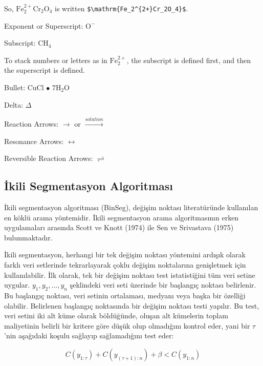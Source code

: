 \documentclass[12pt,twoside]{deuthesis}
\begin{document}
So, \(\mathrm{Fe_2^{2+}Cr_2O_4}\) is written \texttt{\$\textbackslash{}mathrm\{Fe\_2\^{}\{2+\}Cr\_2O\_4\}\$}.

\noindent Exponent or Superscript: \(\mathrm{O^-}\)

\noindent Subscript: \(\mathrm{CH_4}\)

To stack numbers or letters as in \(\mathrm{Fe_2^{2+}}\), the subscript is defined first, and then the superscript is defined.

\noindent Bullet: CuCl \(\bullet\) \(\mathrm{7H_{2}O}\)

\noindent Delta: \(\Delta\)

\noindent Reaction Arrows: \(\longrightarrow\) or \(\xrightarrow{solution}\)

\noindent Resonance Arrows: \(\leftrightarrow\)

\noindent Reversible Reaction Arrows: \(\rightleftharpoons\)

\hypertarget{ikili-segmentasyon-algoritmasux131}{%
\subsection{İkili Segmentasyon Algoritması}\label{ikili-segmentasyon-algoritmasux131}}

İkili segmentasyon algoritması (BinSeg), değişim noktası literatüründe kullanılan en köklü arama yöntemidir. İkili segmentasyon arama algoritmasının erken uygulamaları arasında Scott ve Knott (1974) ile Sen ve Srivastava (1975) bulunmaktadır.

İkili segmentasyon, herhangi bir tek değişim noktası yöntemini ardışık olarak farklı veri setlerinde tekrarlayarak çoklu değişim noktalarına genişletmek için kullanılabilir. İlk olarak, tek bir değişim noktası test istatistiğini tüm veri setine uygular. \(y_{1},y_{2},...,y_{n}\) şeklindeki veri seti üzerinde bir başlangıç noktası belirlenir. Bu başlangıç noktası, veri setinin ortalaması, medyanı veya başka bir özelliği olabilir. Belirlenen başlangıç noktasında bir değişim noktası testi yapılır. Bu test, veri setini iki alt küme olarak böldüğünde, oluşan alt kümelerin toplam maliyetinin belirli bir kritere göre düşük olup olmadığını kontrol eder, yani bir \(\tau\)'nin aşağıdaki koşulu sağlayıp sağlamadığını test eder:

\[C(y_{1:\tau}) + C(y_{(\tau+1):n}) + \beta < C(y_{1:n})\]
\end{document}

